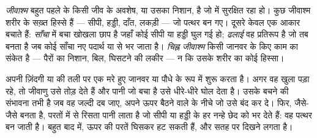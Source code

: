 \begin{definition}[जीवाश्म]\label{def:g7:sediments-and-fossils:fossil}
\emph{जीवाश्म} बहुत पहले के किसी जीव के अवशेष, या उसका निशान,
है जो  में सुरक्षित रहा हो। कुछ जीवाश्म शरीर के सख़्त हिस्से हैं --- सीपी,
हड्डी, दाँत, लकड़ी --- जो पत्थर बन गए। दूसरे केवल एक आकार बचाते हैं:
\emph{साँचा}  में बचा खोखला छाप है जहाँ कोई सीपी या हड्डी
घुल गई हो; \emph{ढलाई} वह प्रतिरूप है जो तब बनता है जब कोई साँचा
नए  पदार्थ या  से भर जाता है। \emph{चिह्न जीवाश्म}
किसी जानवर के किए काम का संकेत है --- पैरों का निशान, बिल, घिसटने की लकीर --- न
कि उसके शरीर का कोई
हिस्सा।
\end{definition}

 अपनी ज़िंदगी  या  की तली पर एक मरे हुए जानवर या पौधे के रूप में
शुरू करता है। अगर वह खुला पड़ा रहे, तो जीवाणु उसे तोड़ देते हैं और पानी जो बचा
है उसे धीरे-धीरे घोल देता है। उसके बचने की संभावना तभी है जब वह जल्दी दब जाए,
अपने ऊपर बैठने वाले  के नीचे जो उसे बंद कर दे। फिर, जैसे-जैसे  
बनता है, परतों में से रिसता पानी  लाता है जो सीपी या हड्डी के हर नन्हे छेद को
भर देते हैं: वह पत्थर बन जाती है। बहुत बाद में, ऊपर की परतें घिसकर हट सकती हैं,
और  सतह पर दिखने
लगता है।

